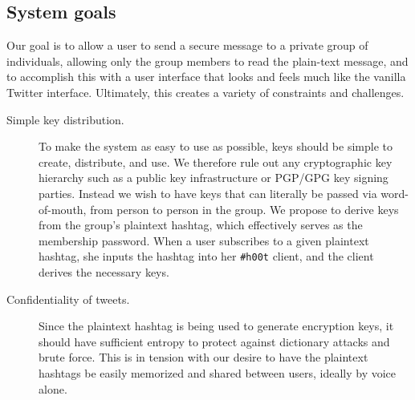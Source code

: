 \documentclass{sig-alternate-arxiv}
\newcommand{\hoot}{{\tt \#h00t}\xspace}
\begin{document}
\subsection{System goals} \label{sec:goals}
Our goal is to allow a user to send a secure message to a private group
of individuals, allowing only the group members to read the plain-text
message, and to accomplish this with a user interface that looks and
feels much like the vanilla Twitter interface. Ultimately, this creates
a variety of constraints and challenges.

\begin{description}

\item[Simple key distribution.] To make the system as easy to use as
  possible, keys should be simple to create, distribute, and use. We
  therefore rule out any cryptographic key hierarchy such as a public
  key infrastructure or PGP/GPG key signing parties. Instead we wish
  to have keys that can literally be passed via
  word-of-mouth, from person to person in the group. We propose
  to derive keys from the group's plaintext hashtag, which effectively
  serves as the membership password. When a user subscribes to a given plaintext
  hashtag, she inputs the hashtag into her \hoot client, and the client
  derives the necessary keys.

\item[Confidentiality of tweets.] Since the plaintext hashtag is being
  used to generate encryption keys, it should have sufficient entropy to
  protect against dictionary attacks and brute force. This is in tension
  with our desire to have the plaintext hashtags be easily memorized and
  shared between users, ideally by voice alone.


\end{description}
\end{document}
